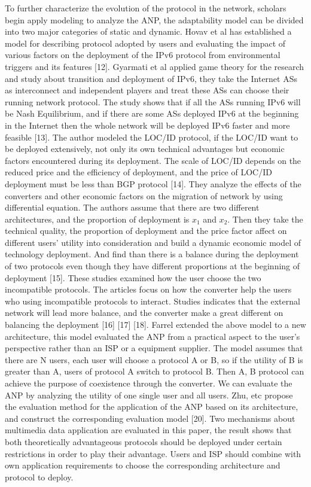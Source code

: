 \documentclass{article}
\begin{document}
To further characterize the evolution of the protocol in the network, scholars begin apply modeling to analyze the
ANP, the adaptability model can be divided into two major categories of static and dynamic. Hovav et al has established
a model for describing protocol adopted by users and evaluating the impact of various factors on the deployment
of the IPv6 protocol from environmental triggers and its features [12]. Gyarmati et al applied game theory for
the research and study about transition and deployment of IPv6, they take the Internet ASs as interconnect and
independent players and treat these ASs can choose their running network protocol. The study shows that if all
the ASs running IPv6 will be Nash Equilibrium, and if there are some ASs deployed IPv6 at the beginning in the
Internet then the whole network will be deployed IPv6 faster and more feasible [13]. The author modeled the LOC/ID
protocol, if the LOC/ID want to be deployed extensively, not only its own technical advantages but economic factors
encountered during its deployment. The scale of LOC/ID depends on the reduced price and the efficiency of deployment,
and the price of LOC/ID deployment must be less than BGP protocol [14]. They analyze the effects of the converters and
other economic factors on the migration of network by using differential equation. The authors assume that there are
two different architectures, and the proportion of deployment is
\(x_{1}\) and \(x_{2}\).
Then they take the technical quality, the proportion of deployment and the price factor affect on different users'
utility into consideration and build a dynamic economic model of technology deployment. And find than there is a
balance during the deployment of two protocols even though they have different proportions at the beginning of
deployment [15]. These studies examined how the user choose the two incompatible protocols. The articles focus
on how the converter help the users who using incompatible protocols to interact. Studies indicates that the external
network will lead more balance, and the converter make a great different on balancing the deployment [16] [17] [18].
Farrel extended the above model to a new architecture, this model evaluated the ANP from a practical aspect to the
user's perspective rather than an ISP or a equipment supplier. The model assumes that there are N users, each user
will choose a protocol A or B, so if the utility of B is greater than A, users of protocol A switch to protocol B.
Then A, B protocol can achieve the purpose of coexistence through the converter. We can evaluate the ANP by analyzing
the utility of one single user and all users. Zhu, etc propose the evaluation method for the application of the
ANP based on its architecture, and construct the corresponding evaluation model [20]. Two mechanisms about multimedia
data application are evaluated in this paper, the result shows that both theoretically advantageous protocols should
be deployed under certain restrictions in order to play their advantage. Users and ISP should combine with own
application requirements to choose the corresponding architecture and protocol to deploy.
\end{document}
